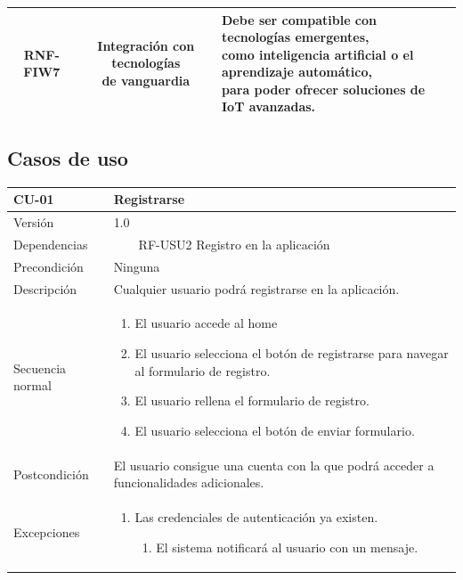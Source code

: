 \documentclass[12pt, a4paper, twoside]{article}
\newcommand{\tabitem}{~~\llap{\textbullet}~~}
\begin{document}
{\begin{longtable}{ |c|c|l| }
  RNF-FIW7 & \makecell[c]{Integración con tecnologías\\ de vanguardia}
  & \makecell[l]{
    Debe ser compatible con tecnologías emergentes,\\
    como inteligencia artificial o el aprendizaje automático,\\
    para poder ofrecer soluciones de IoT avanzadas.
  } \\ \hline

\end{longtable}
}

\subsection{Casos de uso}
\begin{longtable}{ |l|l| }
  \hline
  CU-01 & Registrarse \\ \hline
  Versión & 1.0 \\ \hline
  Dependencias & 
    \tabitem RF-USU2 Registro en la aplicación \\ \hline
  Precondición & Ninguna \\ \hline
  Descripción & Cualquier usuario podrá registrarse en la aplicación. \\ \hline
  Secuencia normal & 
  \parbox{.7\textwidth}{
    \begin{enumerate}
      \item El usuario accede al home
      \item El usuario selecciona el botón de registrarse para navegar al formulario de registro.
      \item El usuario rellena el formulario de registro.
      \item El usuario selecciona el botón de enviar formulario.
    \end{enumerate}
  } \\ \hline
  Postcondición & \parbox{.7\textwidth}{
    \vspace{.5\baselineskip}
    El usuario consigue una cuenta con la que podrá acceder a funcionalidades adicionales.
    \vspace{.5\baselineskip}
  } \\ \hline
  Excepciones & 
  \parbox{.7\textwidth}{
    \begin{enumerate}
      \item Las credenciales de autenticación ya existen.
      \begin{enumerate}
        \item El sistema notificará al usuario con un mensaje.

\end{enumerate}
\end{enumerate}}
\end{longtable}
\end{document}
